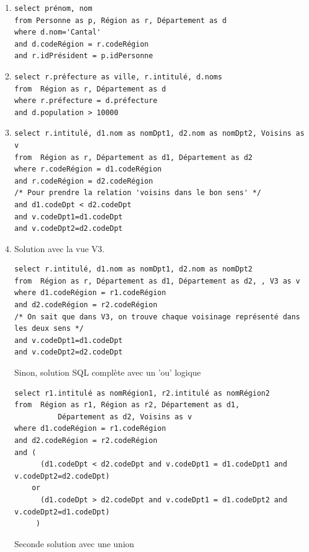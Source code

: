 \begin{solution}


\begin{enumerate}
  \item 
\begin{verbatim}
select prénom, nom
from Personne as p, Région as r, Département as d
where d.nom='Cantal'
and d.codeRégion = r.codeRégion
and r.idPrésident = p.idPersonne
\end{verbatim}

  \item 
\begin{verbatim}
select r.préfecture as ville, r.intitulé, d.noms
from  Région as r, Département as d
where r.préfecture = d.préfecture
and d.population > 10000
\end{verbatim}


  \item 
\begin{verbatim}
select r.intitulé, d1.nom as nomDpt1, d2.nom as nomDpt2, Voisins as v
from  Région as r, Département as d1, Département as d2
where r.codeRégion = d1.codeRégion
and r.codeRégion = d2.codeRégion
/* Pour prendre la relation 'voisins dans le bon sens' */
and d1.codeDpt < d2.codeDpt
and v.codeDpt1=d1.codeDpt
and v.codeDpt2=d2.codeDpt
\end{verbatim}

\item Solution avec la vue V3.
\begin{verbatim}
select r.intitulé, d1.nom as nomDpt1, d2.nom as nomDpt2
from  Région as r, Département as d1, Département as d2, , V3 as v
where d1.codeRégion = r1.codeRégion
and d2.codeRégion = r2.codeRégion
/* On sait que dans V3, on trouve chaque voisinage représenté dans les deux sens */
and v.codeDpt1=d1.codeDpt
and v.codeDpt2=d2.codeDpt
\end{verbatim}

Sinon, solution SQL complète avec un 'ou' logique
\begin{verbatim}
select r1.intitulé as nomRégion1, r2.intitulé as nomRégion2
from  Région as r1, Région as r2, Département as d1, 
          Département as d2, Voisins as v
where d1.codeRégion = r1.codeRégion
and d2.codeRégion = r2.codeRégion
and ( 
      (d1.codeDpt < d2.codeDpt and v.codeDpt1 = d1.codeDpt1 and v.codeDpt2=d2.codeDpt)
    or
      (d1.codeDpt > d2.codeDpt and v.codeDpt1 = d1.codeDpt2 and v.codeDpt2=d1.codeDpt)
     )
\end{verbatim}

Seconde solution avec une union


\end{enumerate}
\end{solution}
